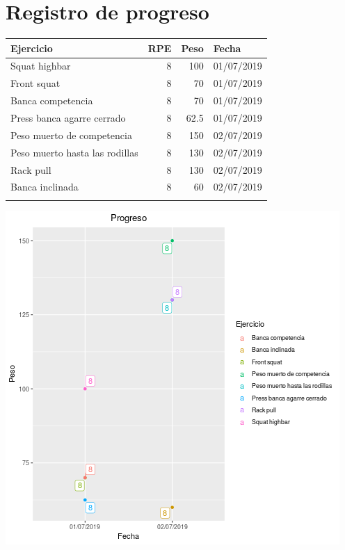 \documentclass[11pt]{article}
\begin{document}
\section{Registro de progreso}
\label{sec:orgd73a04c}
\begin{center}
\label{tab:org44b04f4}
\begin{tabular}{lrrl}
Ejercicio & RPE & Peso & Fecha\\
\hline
Squat highbar & 8 & 100 & 01/07/2019\\
Front squat & 8 & 70 & 01/07/2019\\
Banca competencia & 8 & 70 & 01/07/2019\\
Press banca agarre cerrado & 8 & 62.5 & 01/07/2019\\
Peso muerto de competencia & 8 & 150 & 02/07/2019\\
Peso muerto hasta las rodillas & 8 & 130 & 02/07/2019\\
Rack pull & 8 & 130 & 02/07/2019\\
Banca inclinada & 8 & 60 & 02/07/2019\\
 &  &  & \\
\end{tabular}
\end{center}
\begin{center}
\includegraphics[width=.9\linewidth]{tmp.png}
\end{center}
\end{document}
